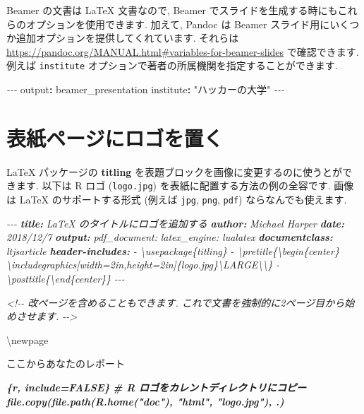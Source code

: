 \documentclass[
  11pt,
]{bxjsreport}
\newenvironment{Shaded}{\begin{snugshade}}{\end{snugshade}}
\newcommand{\AnnotationTok}[1]{\textcolor[rgb]{0.56,0.35,0.01}{\textbf{\textit{#1}}}}
\newcommand{\AttributeTok}[1]{\textcolor[rgb]{0.77,0.63,0.00}{#1}}
\newcommand{\CommentTok}[1]{\textcolor[rgb]{0.56,0.35,0.01}{\textit{#1}}}
\newcommand{\FunctionTok}[1]{\textcolor[rgb]{0.00,0.00,0.00}{#1}}
\newcommand{\InformationTok}[1]{\textcolor[rgb]{0.56,0.35,0.01}{\textbf{\textit{#1}}}}
\newcommand{\KeywordTok}[1]{\textcolor[rgb]{0.13,0.29,0.53}{\textbf{#1}}}
\newcommand{\NormalTok}[1]{#1}
\newcommand{\PreprocessorTok}[1]{\textcolor[rgb]{0.56,0.35,0.01}{\textit{#1}}}
\newcommand{\StringTok}[1]{\textcolor[rgb]{0.31,0.60,0.02}{#1}}
\begin{document}
Beamer の文書は LaTeX 文書なので, Beamer でスライドを生成する時にもこれらのオプションを使用できます. 加えて, Pandoc は Beamer スライド用にいくつか追加オプションを提供してくれています. それらは \url{https://pandoc.org/MANUAL.html\#variables-for-beamer-slides} で確認できます. 例えば \texttt{institute} オプションで著者の所属機関を指定することができます.

\begin{Shaded}
\begin{Highlighting}[]
\PreprocessorTok{{-}{-}{-}}
\FunctionTok{output}\KeywordTok{:}\AttributeTok{ beamer\_presentation}
\FunctionTok{institute}\KeywordTok{:}\AttributeTok{ }\StringTok{"ハッカーの大学"}
\PreprocessorTok{{-}{-}{-}}
\end{Highlighting}
\end{Shaded}

\hypertarget{latex-logo}{%
\section{表紙ページにロゴを置く}\label{latex-logo}}

LaTeX パッケージの \textbf{titling}  を表題ブロックを画像に変更するのに使うとができます. 以下は R ロゴ (\texttt{logo.jpg}) を表紙に配置する方法の例の全容です. 画像は LaTeX のサポートする形式 (例えば \texttt{jpg}, \texttt{png}, \texttt{pdf}) ならなんでも使えます.

\begin{Shaded}
\begin{Highlighting}[]
\CommentTok{{-}{-}{-}}
\AnnotationTok{title:}\CommentTok{ LaTeX のタイトルにロゴを追加する}
\AnnotationTok{author:}\CommentTok{ Michael Harper}
\AnnotationTok{date:}\CommentTok{ 2018/12/7}
\AnnotationTok{output:}
\CommentTok{  pdf\_document:}
\CommentTok{    latex\_engine: lualatex}
\AnnotationTok{documentclass:}\CommentTok{ ltjsarticle}
\AnnotationTok{header{-}includes:}
\CommentTok{  {-} \textbackslash{}usepackage\{titling\}}
\CommentTok{  {-} \textbackslash{}pretitle\{\textbackslash{}begin\{center\}}
\CommentTok{    \textbackslash{}includegraphics[width=2in,height=2in]\{logo.jpg\}\textbackslash{}LARGE\textbackslash{}\textbackslash{}\}}
\CommentTok{  {-} \textbackslash{}posttitle\{\textbackslash{}end\{center\}\}}
\CommentTok{{-}{-}{-}}

\CommentTok{\textless{}!{-}{-} 改ページを含めることもできます. これで文書を強制的に2ページ目から始めさせます. {-}{-}\textgreater{}}

\NormalTok{\textbackslash{}newpage}

\NormalTok{ここからあなたのレポート}

\InformationTok{\textasciigrave{}\textasciigrave{}\textasciigrave{}\{r, include=FALSE\}}
\InformationTok{\# R ロゴをカレントディレクトリにコピー}
\InformationTok{file.copy(file.path(R.home("doc"), "html", "logo.jpg"), \textquotesingle{}.\textquotesingle{})}
\InformationTok{\textasciigrave{}\textasciigrave{}\textasciigrave{}}
\end{Highlighting}
\end{Shaded}
\end{document}
